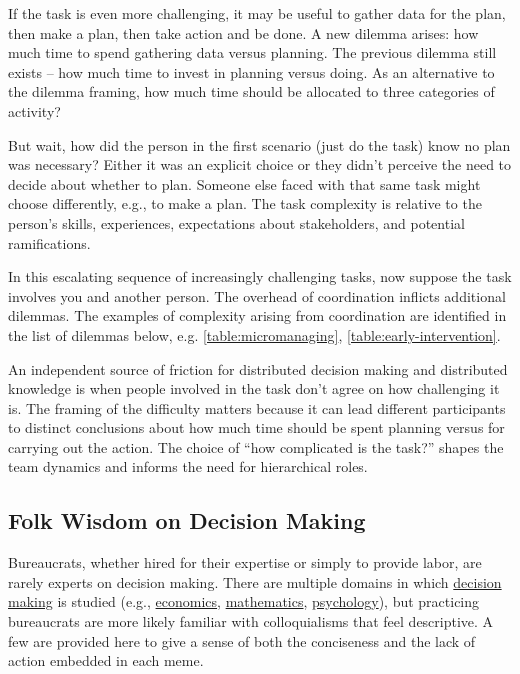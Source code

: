 If the task is even more challenging, it may be useful to gather data for the plan, then make a plan, then take action and be done. A new dilemma arises: how much time to spend gathering data versus planning. The previous dilemma still exists -- how much time to invest in planning versus doing. As an alternative to the dilemma framing, how much time should be allocated to three categories of activity?

But wait, how did the person in the first scenario (just do the task) know no plan was necessary? Either it was an explicit choice or they didn't perceive the need to decide about whether to plan. Someone else faced with that same task might choose differently, e.g., to make a plan. The task complexity is relative to the person's skills, experiences, expectations about stakeholders, and potential ramifications.

In this escalating sequence of increasingly challenging tasks, now suppose the task involves you and another person. The overhead of coordination inflicts additional dilemmas. The examples of complexity arising from coordination are identified in the list of dilemmas below, e.g. \ref{table:micromanaging}, \ref{table:early-intervention}.

An independent source of friction for distributed decision making and distributed knowledge is when people involved in the task don't agree on how challenging it is. The framing of the difficulty matters because it can lead different participants to distinct conclusions about how much time should be spent planning versus for carrying out the action. The choice of ``how complicated is the task?'' shapes the team dynamics and informs the need for hierarchical roles. 

\subsection*{Folk Wisdom on Decision Making}

Bureaucrats, whether hired for their expertise or simply to provide labor, are rarely experts on decision making. There are multiple domains in which \href{https://en.wikipedia.org/wiki/Decision_theory}{decision making} is studied (e.g., \href{https://en.wikipedia.org/wiki/Rational_choice_theory}{economics}, \href{https://en.wikipedia.org/wiki/Game_theory}{mathematics}, \href{https://en.wikipedia.org/wiki/Decision-making}{psychology}), but practicing bureaucrats are more likely familiar with colloquialisms that feel descriptive. A few are provided here to give a sense of both the conciseness and the lack of action embedded in each meme.

